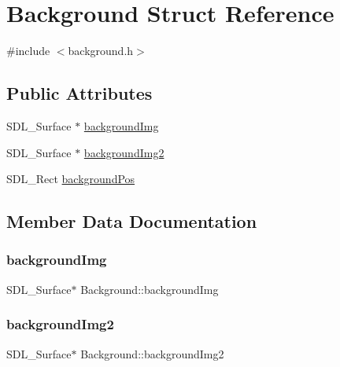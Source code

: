 \hypertarget{structBackground}{}\section{Background Struct Reference}
\label{structBackground}


{\ttfamily \#include $<$background.\+h$>$}

\subsection*{Public Attributes}
\begin{DoxyCompactItemize}
\item 
S\+D\+L\+\_\+\+Surface $\ast$ \hyperlink{structBackground_ade7f4649cb1e02ab75167ce898db884c}{background\+Img}
\item 
S\+D\+L\+\_\+\+Surface $\ast$ \hyperlink{structBackground_ada3923cbaf5000aac226a433649f4034}{background\+Img2}
\item 
S\+D\+L\+\_\+\+Rect \hyperlink{structBackground_a81fdaea521be13c6634186f72b105e33}{background\+Pos}
\end{DoxyCompactItemize}


\subsection{Member Data Documentation}
\mbox{\label{structBackground_ade7f4649cb1e02ab75167ce898db884c}} 
\subsubsection{\texorpdfstring{background\+Img}{backgroundImg}}
{\footnotesize\ttfamily S\+D\+L\+\_\+\+Surface$\ast$ Background\+::background\+Img}

\mbox{\label{structBackground_ada3923cbaf5000aac226a433649f4034}} 
\subsubsection{\texorpdfstring{background\+Img2}{backgroundImg2}}
{\footnotesize\ttfamily S\+D\+L\+\_\+\+Surface$\ast$ Background\+::background\+Img2}

